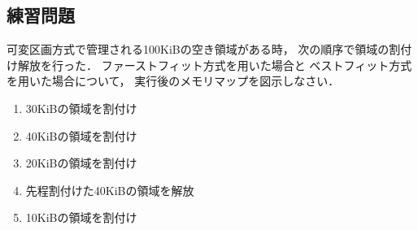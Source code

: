 \subsection*{練習問題}
可変区画方式で管理される100KiBの空き領域がある時，
次の順序で領域の割付け解放を行った．
ファーストフィット方式を用いた場合と
ベストフィット方式を用いた場合について，
実行後のメモリマップを図示しなさい．

\begin{enumerate}
\item 30KiBの領域を割付け
\item 40KiBの領域を割付け
\item 20KiBの領域を割付け
\item 先程割付けた40KiBの領域を解放
\item 10KiBの領域を割付け
\end{enumerate}
